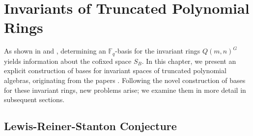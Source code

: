 \documentclass[12pt,a4paper]{report}
\theoremstyle{definition}
\theoremstyle{remark}
\theoremstyle{definition}
\begin{document}
\chapter{Invariants of Truncated Polynomial Rings}\label{chap:trucated_invariants}
As shown in  and , determining an $\mathbb{F}_q$-basis for the invariant rings $Q(m, n)^G$ yields information about the cofixed space $S_B$. In this chapter, we present an explicit construction of bases for invariant spaces of truncated polynomial algebras, originating from the papers \cite{Ha_Hai_Nghia_2024, ha_hai_nghia_GL, ha_hai_nghia_parabolic_for_low_rank}. Following the novel construction of bases for these invariant rings, new problems arise; we examine them in more detail in subsequent sections.   
\section{Lewis-Reiner-Stanton Conjecture}\label{sec:the_conj}
\end{document}
